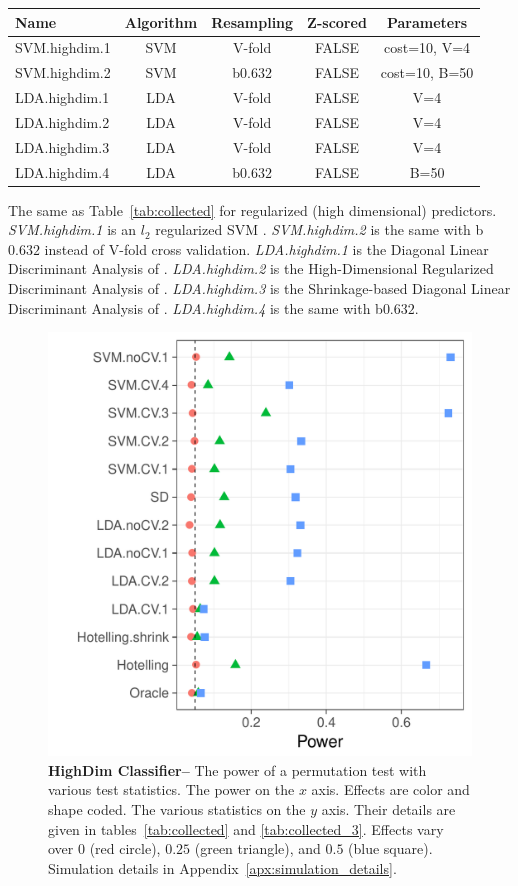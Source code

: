 \documentclass[12pt,a4paper]{article}
\begin{document}
\begin{tcolorbox}
\centering
\begin{tabular}{l|c|c|c|c}
Name & Algorithm & Resampling & Z-scored & Parameters\\ 
\hline
\hline
SVM.highdim.1 & SVM & V-fold & FALSE & cost=10, V=4 \\ 
SVM.highdim.2 & SVM & b$0.632$ & FALSE & cost=10, B=50 \\ 
LDA.highdim.1 & LDA & V-fold & FALSE & V=4 \\ 
LDA.highdim.2 & LDA & V-fold & FALSE & V=4 \\ 
LDA.highdim.3 & LDA & V-fold & FALSE & V=4 \\ 
LDA.highdim.4 & LDA & b$0.632$ & FALSE & B=50 \\ 
\end{tabular} 
\captionsetup{type=table}
\caption{
The same as Table~\ref{tab:collected} for regularized (high dimensional) predictors. 
\emph{SVM.highdim.1} is an $l_2$ regularized SVM \citep{friedman_regularization_2010}. 
\emph{SVM.highdim.2} is the same with b$0.632$ instead of V-fold cross validation. 
\emph{LDA.highdim.1} is the Diagonal Linear Discriminant Analysis of \cite{dudoit_comparison_2002}.
\emph{LDA.highdim.2} is the High-Dimensional Regularized Discriminant Analysis of \cite{ramey_high-dimensional_2016}.
\emph{LDA.highdim.3} is the Shrinkage-based Diagonal Linear Discriminant Analysis of \cite{pang_shrinkage-based_2009}.
\emph{LDA.highdim.4} is the same with b$0.632$.
} 
\label{tab:collected_3}
\end{tcolorbox}


\begin{figure}[ht]
\centering
	  \includegraphics[width=0.7\linewidth]{"art/file14"}
	  \caption{
\textbf{HighDim Classifier--} 
		The power of a permutation test with various test statistics. 
		The power on the $x$ axis. 
		Effects are color and shape coded. 
		The various statistics on the $y$ axis. 
		Their details are given in tables~\ref{tab:collected} and \ref{tab:collected_3}. 
		Effects vary over $0$ (red circle), $0.25$ (green triangle), and $0.5$ (blue square). 
		Simulation details in Appendix~\ref{apx:simulation_details}.
} 
	\label{fig:highdim}
\end{figure}
\end{document}
